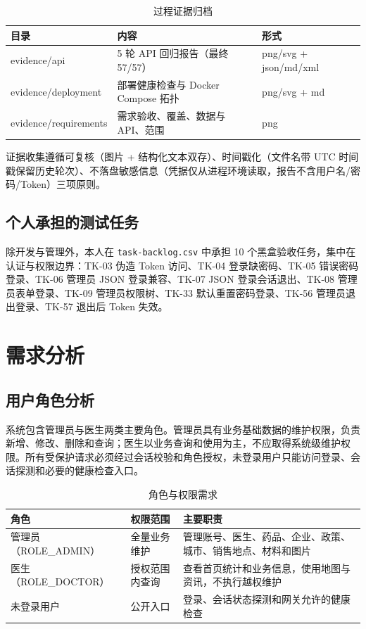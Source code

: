 \documentclass[UTF8,a4paper,12pt,openany,fontset=windows]{ctexrep}
\begin{document}
\begin{table}[H]
  \centering
  \caption{过程证据归档}\label{tab:evidence}
  \begin{tabularx}{\textwidth}{p{4.2cm}p{3.2cm}L}
    \toprule
    目录 & 内容 & 形式 \\
    \midrule
    evidence/api & 5 轮 API 回归报告（最终 57/57） & png/svg + json/md/xml \\
    evidence/deployment & 部署健康检查与 Docker Compose 拓扑 & png/svg + md \\
    evidence/requirements & 需求验收、覆盖、数据与 API、范围 & png \\
    \bottomrule
  \end{tabularx}
\end{table}

证据收集遵循可复核（图片 + 结构化文本双存）、时间戳化（文件名带 UTC 时间戳保留历史轮次）、不落盘敏感信息（凭据仅从进程环境读取，报告不含用户名/密码/Token）三项原则。

\section{个人承担的测试任务}
除开发与管理外，本人在 \texttt{task-backlog.csv} 中承担 10 个黑盒验收任务，集中在认证与权限边界：TK-03 伪造 Token 访问、TK-04 登录缺密码、TK-05 错误密码登录、TK-06 管理员 JSON 登录兼容、TK-07 JSON 登录会话退出、TK-08 管理员表单登录、TK-09 管理员权限树、TK-33 默认重置密码登录、TK-56 管理员退出登录、TK-57 退出后 Token 失效。

\chapter{需求分析}

\section{用户角色分析}
系统包含管理员与医生两类主要角色。管理员具有业务基础数据的维护权限，负责新增、修改、删除和查询；医生以业务查询和使用为主，不应取得系统级维护权限。所有受保护请求必须经过会话校验和角色授权，未登录用户只能访问登录、会话探测和必要的健康检查入口。

\begin{table}[H]
  \centering
  \caption{角色与权限需求}
  \begin{tabularx}{\textwidth}{p{3.6cm}p{3.0cm}L}
    \toprule
    角色 & 权限范围 & 主要职责 \\
    \midrule
    管理员（ROLE\_ADMIN） & 全量业务维护 & 管理账号、医生、药品、企业、政策、城市、销售地点、材料和图片 \\
    医生（ROLE\_DOCTOR） & 授权范围内查询 & 查看首页统计和业务信息，使用地图与资讯，不执行越权维护 \\
    未登录用户 & 公开入口 & 登录、会话状态探测和网关允许的健康检查 \\
    \bottomrule
  \end{tabularx}
\end{table}
\end{document}
